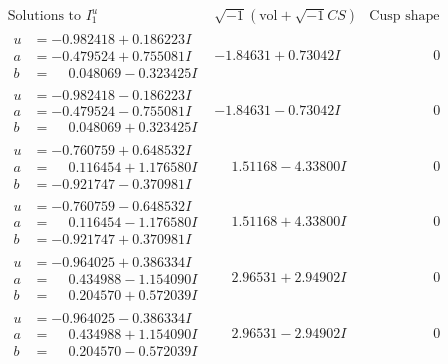 \documentclass[1p]{elsarticle_modified}
\theoremstyle{definition}
\newcommand{\I}{\sqrt{-1}}
\begin{document}
$$\begin{array}{c|c|c}  
\text{Solutions to }I^u_{1}& \I (\text{vol} + \sqrt{-1}CS) & \text{Cusp shape}\\
 \hline 
\begin{aligned}
u &= -0.982418 + 0.186223 I \\
a &= -0.479524 + 0.755081 I \\
b &= \phantom{-}0.048069 - 0.323425 I\end{aligned}
 & -1.84631 + 0.73042 I & \phantom{-0.000000 } 0 \\ \hline\begin{aligned}
u &= -0.982418 - 0.186223 I \\
a &= -0.479524 - 0.755081 I \\
b &= \phantom{-}0.048069 + 0.323425 I\end{aligned}
 & -1.84631 - 0.73042 I & \phantom{-0.000000 } 0 \\ \hline\begin{aligned}
u &= -0.760759 + 0.648532 I \\
a &= \phantom{-}0.116454 + 1.176580 I \\
b &= -0.921747 - 0.370981 I\end{aligned}
 & \phantom{-}1.51168 - 4.33800 I & \phantom{-0.000000 } 0 \\ \hline\begin{aligned}
u &= -0.760759 - 0.648532 I \\
a &= \phantom{-}0.116454 - 1.176580 I \\
b &= -0.921747 + 0.370981 I\end{aligned}
 & \phantom{-}1.51168 + 4.33800 I & \phantom{-0.000000 } 0 \\ \hline\begin{aligned}
u &= -0.964025 + 0.386334 I \\
a &= \phantom{-}0.434988 - 1.154090 I \\
b &= \phantom{-}0.204570 + 0.572039 I\end{aligned}
 & \phantom{-}2.96531 + 2.94902 I & \phantom{-0.000000 } 0 \\ \hline\begin{aligned}
u &= -0.964025 - 0.386334 I \\
a &= \phantom{-}0.434988 + 1.154090 I \\
b &= \phantom{-}0.204570 - 0.572039 I\end{aligned}
 & \phantom{-}2.96531 - 2.94902 I & \phantom{-0.000000 } 0 \\ \hline\begin{aligned}

\end{aligned}
\end{array}$$
\end{document}
